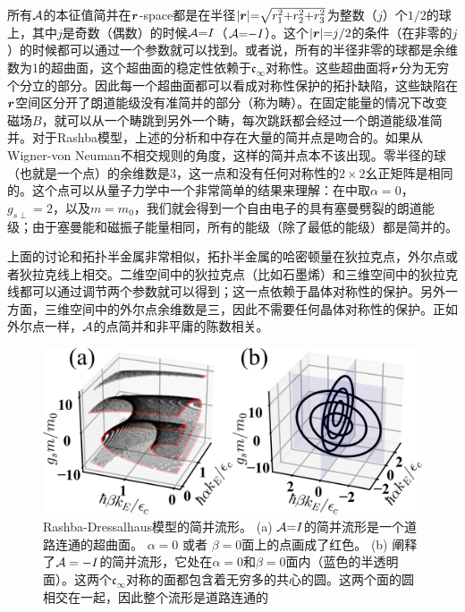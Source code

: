 所有${\cal A}$的本征值简并在$\boldsymbol{r}$-space都是在半径$|\boldsymbol{r}|{=}\sqrt{r_1^2{+}r_2^2{+}r_3^2}$为整数（$j$）个$1/2$的球上，其中${j}$是奇数（偶数）的时候${\cal A}{=}I$（${\cal A}{=}{-}I$）。这个$|\boldsymbol{r}|{=}j/2$的条件（在非零的$j$）的时候都可以通过一个参数就可以找到。或者说，所有的半径非零的球都是余维数为1的超曲面，这个超曲面的稳定性依赖于$\mathfrak{c}_{\infty}$对称性。这些超曲面将$\boldsymbol{r}$分为无穷个分立的部分。因此每一个超曲面都可以看成对称性保护的拓扑缺陷，这些缺陷在$\boldsymbol{r}$空间区分开了朗道能级没有准简并的部分（称为畴）。在固定能量的情况下改变磁场$B$，就可以从一个畴跳到另外一个畴，每次跳跃都会经过一个朗道能级准简并。对于Rashba模型，上述的分析和中存在大量的简并点是吻合的。如果从Wigner-von Neuman不相交规则的角度\cite{neumann2000behaviour}，这样的简并点本不该出现。零半径的球（也就是一个点）的余维数是3，这一点和没有任何对称性的$2\times 2$幺正矩阵是相同的。这个点可以从量子力学中一个非常简单的结果来理解：在中取$\alpha{=}0$，$g_{s\perp}{=}2$，以及$m{=}m_0$，我们就会得到一个自由电子的具有塞曼劈裂的朗道能级；由于塞曼能和磁振子能量相同，所有的能级（除了最低的能级）都是简并的\cite{landau2013course}。


上面的讨论和拓扑半金属非常相似，拓扑半金属的哈密顿量在狄拉克点，外尔点\cite{wang2012dirac,wan2011topological}或者狄拉克线\cite{burkov2011topological}上相交。二维空间中的狄拉克点（比如石墨烯\cite{neto2009electronic}）和三维空间中的狄拉克线都可以通过调节两个参数就可以得到；这一点依赖于晶体对称性的保护。另外一方面，三维空间中的外尔点余维数是三，因此不需要任何晶体对称性的保护。正如外尔点一样，${\cal A}$的点简并和非平庸的陈数相关\cite{TKNN}。

\begin{figure}
	\includegraphics[width=1.0\columnwidth]{../figures/dgn.png}
	\centering
	\caption{Rashba-Dressalhaus模型的简并流形。 (a) ${\cal A}{=}I$的简并流形是一个道路连通的超曲面。 $\alpha=0$ 或者 $\beta=0$面上的点画成了红色。 (b) 阐释了${\cal A}=-I$的简并流形，它处在$\alpha{=}0$和$\beta{=}0$面内（蓝色的半透明面）。这两个$\mathfrak{c}_{\infty}$对称的面都包含着无穷多的共心的圆。这两个面的圆相交在一起，因此整个流形是道路连通的 \label{fig:dgn}}
\end{figure}


